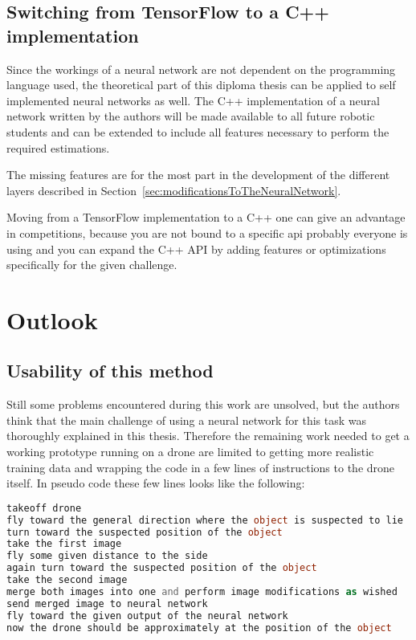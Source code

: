 \subsection{Switching from TensorFlow to a C++ implementation}
Since the workings of a neural network are not dependent on the programming language used, the theoretical part of this diploma thesis can be applied to self implemented neural networks as well. The C++ implementation of a neural network written by the authors will be made available to all future robotic students and can be extended to include all features necessary to perform the required estimations.

The missing features are for the most part in the development of the different layers described in Section~\ref{sec:modificationsToTheNeuralNetwork}.

Moving from a TensorFlow implementation to a C++ one can give an advantage in competitions, because you are not bound to a specific api probably everyone is using and you can expand the C++ API by adding features or optimizations specifically for the given challenge.

\section{Outlook}

\subsection{Usability of this method}

Still some problems encountered during this work are unsolved, but the authors think that the main challenge of using a neural network for this task was thoroughly explained in this thesis. Therefore the remaining work needed to get a working prototype running on a drone are limited to getting more realistic training data and wrapping the code in a few lines of instructions to the drone itself. In pseudo code these few lines looks like the following:


\begin{lstlisting}[language=PHP]	%actually pseudo code, but php shows no syntax highlighting
takeoff drone
fly toward the general direction where the object is suspected to lie
turn toward the suspected position of the object
take the first image
fly some given distance to the side
again turn toward the suspected position of the object
take the second image
merge both images into one and perform image modifications as wished
send merged image to neural network
fly toward the given output of the neural network
now the drone should be approximately at the position of the object
\end{lstlisting}

